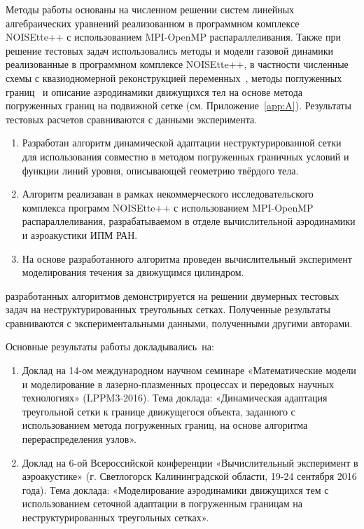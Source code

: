 {\methods} Методы работы основаны на численном решении систем линейных алгебраических уравнений реализованном в программном комплексе 
 NOISEtte++ с использованием MPI-OpenMP распараллеливания. Также при решение тестовых задач использовались методы и модели газовой динамики реализованные в программном комплексе NOISEtte++, в частности численные  схемы с квазиодномерной реконструкцией переменных~\cite{abalakin2016edge}, методы поглуженных границ~\cite{abalakin2019ibm, kozubskaya2019numerical} и описание аэродинамики движущихся тел на основе метода погруженных границ на подвижной сетке (см. Приложение~\ref{app:A}). Результаты тестовых расчетов сравниваются с данными эксперимента.

{}
\begin{enumerate}
\item  Разработан алгоритм динамической адаптации неструктурированной сетки для  использования совместно в методом погруженных граничных условий и функции линий уровня, описывающей геометрию твёрдого тела.
\item Алгоритм реализаван в рамках некоммерческого исследовательского комплекса программ NOISEtte++ с использованием MPI-OpenMP распараллеливания, разрабатываемом в отделе вычислительной аэродинамики и аэроакустики ИПМ РАН.
\item На основе разработанного алгоритма проведен вычислительный эксперимент моделирования течения за движущимся цилиндром.
\end{enumerate}

{\reliability} разработанных алгоритмов демонстрируется на решении двумерных тестовых задач на неструктурированных треугольных сетках. Полученные результаты сравниваются с экспериментальными данными, полученными другими авторами.

{\probation}
Основные результаты работы докладывались~на:
\begin{enumerate}
	\item Доклад на 14-ом международном научном семинаре «Математические модели и моделирование в лазерно-плазменных процессах и передовых научных технологиях» (LPPM3-2016). Тема доклада:  «Динамическая адаптация треугольной сетки к границе движущегося объекта, заданного с использованием метода погруженных границ, на основе алгоритма перераспределения узлов».

	\item Доклад на 6-ой Всероссийской конференции «Вычислительный эксперимент в аэроакустике» (г. Светлогорск Калининградской области, 19-24 сентября 2016 года). Тема доклада: «Моделирование аэродинамики движущихся тем с использованием сеточной адаптации в погруженным границам на неструктурированных треугольных сетках».~\citeauthor{ceaa_2016}
\end{enumerate}

